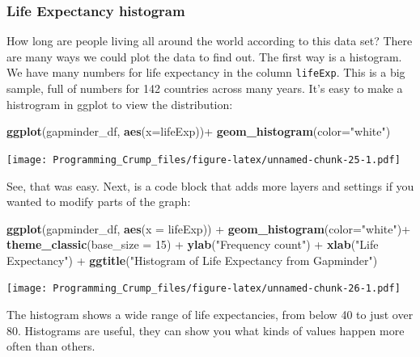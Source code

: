 \documentclass[]{book}
\newenvironment{Shaded}{\begin{snugshade}}{\end{snugshade}}
\newcommand{\KeywordTok}[1]{\textcolor[rgb]{0.13,0.29,0.53}{\textbf{{#1}}}}
\newcommand{\DataTypeTok}[1]{\textcolor[rgb]{0.13,0.29,0.53}{{#1}}}
\newcommand{\DecValTok}[1]{\textcolor[rgb]{0.00,0.00,0.81}{{#1}}}
\newcommand{\StringTok}[1]{\textcolor[rgb]{0.31,0.60,0.02}{{#1}}}
\newcommand{\NormalTok}[1]{{#1}}
\theoremstyle{definition}
\theoremstyle{definition}
\theoremstyle{definition}
\theoremstyle{remark}
\begin{document}
\subsubsection{Life Expectancy
histogram}\label{life-expectancy-histogram}

How long are people living all around the world according to this data
set? There are many ways we could plot the data to find out. The first
way is a histogram. We have many numbers for life expectancy in the
column \texttt{lifeExp}. This is a big sample, full of numbers for 142
countries across many years. It's easy to make a histrogram in ggplot to
view the distribution:

\begin{Shaded}
\begin{Highlighting}[]
\KeywordTok{ggplot}\NormalTok{(gapminder_df, }\KeywordTok{aes}\NormalTok{(}\DataTypeTok{x=}\NormalTok{lifeExp))+}
\StringTok{  }\KeywordTok{geom_histogram}\NormalTok{(}\DataTypeTok{color=}\StringTok{"white"}\NormalTok{)}
\end{Highlighting}
\end{Shaded}

\texttt{[image: Programming\_Crump\_files/figure-latex/unnamed-chunk-25-1.pdf]}

See, that was easy. Next, is a code block that adds more layers and
settings if you wanted to modify parts of the graph:

\begin{Shaded}
\begin{Highlighting}[]
\KeywordTok{ggplot}\NormalTok{(gapminder_df, }\KeywordTok{aes}\NormalTok{(}\DataTypeTok{x =} \NormalTok{lifeExp)) +}
\StringTok{  }\KeywordTok{geom_histogram}\NormalTok{(}\DataTypeTok{color=}\StringTok{"white"}\NormalTok{)+}\StringTok{ }
\StringTok{  }\KeywordTok{theme_classic}\NormalTok{(}\DataTypeTok{base_size =} \DecValTok{15}\NormalTok{) +}
\StringTok{  }\KeywordTok{ylab}\NormalTok{(}\StringTok{"Frequency count"}\NormalTok{) +}\StringTok{ }
\StringTok{  }\KeywordTok{xlab}\NormalTok{(}\StringTok{"Life Expectancy"}\NormalTok{) +}
\StringTok{  }\KeywordTok{ggtitle}\NormalTok{(}\StringTok{"Histogram of Life Expectancy from Gapminder"}\NormalTok{)}
\end{Highlighting}
\end{Shaded}

\texttt{[image: Programming\_Crump\_files/figure-latex/unnamed-chunk-26-1.pdf]}

The histogram shows a wide range of life expectancies, from below 40 to
just over 80. Histograms are useful, they can show you what kinds of
values happen more often than others.
\end{document}
